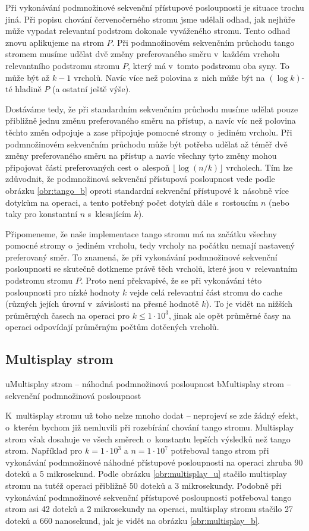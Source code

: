 Při vykonávání podmnožinové sekvenční přístupové posloupnosti je situace trochu
jiná. Při popisu chování červenočerného stromu jsme udělali odhad, jak nejhůře
může vypadat relevantní podstrom dokonale vyváženého stromu. Tento odhad znovu
aplikujeme na strom $P$. Při podmnožinovém sekvenčním průchodu tango stromem
musíme udělat dvě změny preferovaného směru v~každém vrcholu relevantního
podstromu stromu $P$, který má v~tomto podstromu oba syny. To může být až $k-1$
vrcholů. Navíc více než polovina z~nich může být na $(\log k)$-té hladině $P$
(a ostatní ještě výše).

Dostáváme tedy, že při standardním sekvenčním průchodu musíme udělat pouze
přibližně jednu změnu preferovaného směru na přístup, a navíc víc než polovina
těchto změn odpojuje a zase připojuje pomocné stromy o~jediném vrcholu. Při
podmnožinovém sekvenčním průchodu může být potřeba udělat až téměř dvě změny
preferovaného směru na přístup a navíc všechny tyto změny mohou připojovat
části preferovaných cest o~alespoň $\lfloor\log (n/k)\rfloor$ vrcholech. Tím
lze zdůvodnit, že podmnožinová sekvenční přístupová posloupnost vede podle obrázku \ref{obr:tango_b} oproti
standardní sekvenční přístupové k~násobně více dotykům na operaci, a tento
potřebný počet dotyků dále s~rostoucím $n$ (nebo taky pro konstantní $n$
s~klesajícím $k$). 

Připomeneme, že naše implementace tango stromu má na začátku všechny pomocné
stromy o~jediném vrcholu, tedy vrcholy na počátku nemají nastavený preferovaný
směr. To znamená, že při vykonávání podmnožinové sekvenční posloupnosti se
skutečně dotkneme právě těch vrcholů, které jsou v~relevantním podstromu stromu
$P$. Proto není překvapivé, že se při vykonávání této posloupnosti pro nízké
hodnoty $k$ vejde celá relevantní část stromu do cache (různých jejích úrovní
v~závislosti na přesné hodnotě $k$). To je vidět na nižších průměrných časech na
operaci pro $k \leq 1\cdot 10^3$, jinak ale opět průměrné časy na operaci
odpovídají průměrným počtům dotčených vrcholů.

\subsection {Multisplay strom}

u{Multisplay strom -- náhodná podmnožinová posloupnost}
b{Multisplay strom -- sekvenční podmnožinová posloupnost}

K~multisplay stromu už toho nelze mnoho dodat -- neprojeví se zde žádný efekt,
o~kterém bychom již nemluvili při rozebírání chování tango stromu. Multisplay
strom však dosahuje ve všech směrech o~konstantu lepších výsledků než tango
strom. Například pro $k=1\cdot10^3$ a $n=1\cdot 10^7$ potřeboval tango strom
při vykonávání podmnožinové náhodné přístupové posloupnosti na operaci zhruba
90 doteků a 5 mikrosekund. Podle obrázku \ref{obr:multisplay_u} stačilo
multisplay stromu na tutéž operaci přibližně 50 doteků a 3 mikrosekundy.
Podobně při vykonávání podmnožinové sekvenční přístupové posloupnosti
potřeboval tango strom asi 42 doteků a 2 mikrosekundy na operaci, multisplay
stromu stačilo 27 doteků a 660 nanosekund, jak je vidět na obrázku
\ref{obr:multisplay_b}.


